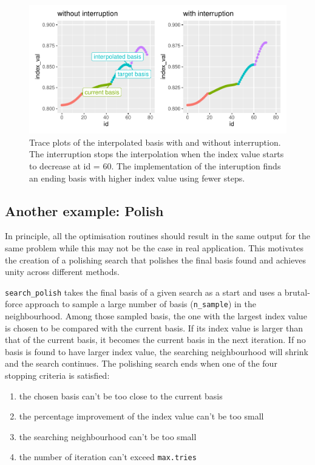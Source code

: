 \documentclass[12pt]{article}
\providecommand{\tightlist}{%
  \setlength{\itemsep}{0pt}\setlength{\parskip}{0pt}}
\begin{document}
\begin{figure}
\centering
\includegraphics{paper_files/figure-latex/interruption-1.pdf}
\caption{\label{interruption}Trace plots of the interpolated basis with
and without interruption. The interruption stops the interpolation when
the index value starts to decrease at id = 60. The implementation of the
interuption finds an ending basis with higher index value using fewer
steps.}
\end{figure}

\hypertarget{another-example-polish}{%
\subsection{Another example: Polish}\label{another-example-polish}}

In principle, all the optimisation routines should result in the same
output for the same problem while this may not be the case in real
application. This motivates the creation of a polishing search that
polishes the final basis found and achieves unity across different
methods.

\texttt{search\_polish} takes the final basis of a given search as a
start and uses a brutal-force approach to sample a large number of basis
(\texttt{n\_sample}) in the neighbourhood. Among those sampled basis,
the one with the largest index value is chosen to be compared with the
current basis. If its index value is larger than that of the current
basis, it becomes the current basis in the next iteration. If no basis
is found to have larger index value, the searching neighbourhood will
shrink and the search continues. The polishing search ends when one of
the four stopping criteria is satisfied:

\begin{enumerate}
\def\labelenumi{\arabic{enumi})}
\tightlist
\item
  the chosen basis can't be too close to the current basis
\item
  the percentage improvement of the index value can't be too small
\item
  the searching neighbourhood can't be too small
\item
  the number of iteration can't exceed \texttt{max.tries}
\end{enumerate}
\end{document}
